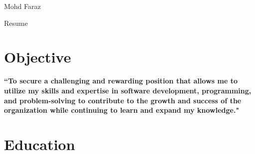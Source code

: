 \documentclass[
	10pt, %
	]{FreemanCV}
\begin{document}
\begin{paracol}{2} %


\parbox[][0.11\textheight][c]{\linewidth}{ %
	\centering %
	
	{\sffamily\Huge Mohd Faraz} %
	
	\medskip %
	
	{\cursivefont\Huge\textcolor{headings}{Resume}}
	
	\vfill %
}


\section{Objective}

{\justifying\textbf{``To secure a challenging and rewarding position that allows me to utilize my skills and expertise in software development, programming, and problem-solving to contribute to the growth and success of the organization while continuing to learn and expand my knowledge."}\par}

\medskip %


\section{Education} 




\end{paracol}
\end{document}
